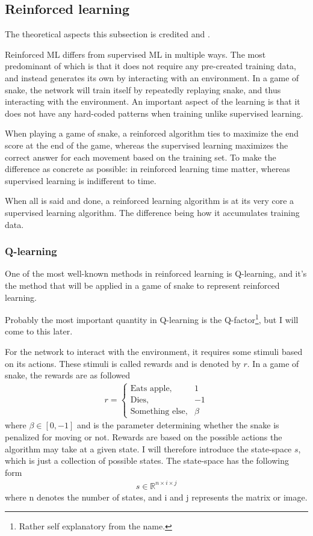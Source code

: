 \documentclass[%
 uio,
 jmp,
 amsmath,amssymb,
 reprint, nofootinbib]{revtex4-1}
\numberwithin{equation}{section}
\begin{document}
\subsection{Reinforced learning}

The theoretical aspects this subsection is credited \cite{RL} and \cite{wiki:Reinforcement_learning}.

Reinforced ML differs from supervised ML in multiple ways. The most predominant of which is that it does not require any pre-created training data, and instead generates its own by interacting with an environment. In a game of snake, the network will train itself by repeatedly replaying snake, and thus interacting with the environment. An important aspect of the learning is that it does not have any hard-coded patterns when training unlike supervised learning.

When playing a game of snake, a reinforced algorithm ties to maximize the end score at the end of the game, whereas the supervised learning maximizes the correct answer for each movement based on the training set. To make the difference as concrete as possible: in reinforced learning time matter, whereas supervised learning is indifferent to time.

When all is said and done, a reinforced learning algorithm is at its very core a supervised learning algorithm. The difference being how it accumulates training data.

\subsubsection{Q-learning}

One of the most well-known methods in reinforced learning is Q-learning, and it's the method that will be applied in a game of snake to represent reinforced learning.

Probably the most important quantity in Q-learning is the Q-factor\footnote{Rather self explanatory from the name.}, but I will come to this later.

For the network to interact with the environment, it requires some stimuli based on its actions. These stimuli is called rewards and is denoted by \(r\). In a game of snake, the rewards are as followed
\begin{align}\label{eq:13}
r = 
\begin{cases} 
  \text{Eats apple,} & 1 \\ 
  \text{Dies,} & -1\\
  \text{Something else,} & \beta
\end{cases}
\end{align}
where \(\beta\in [0,-1]\) and is the parameter determining whether the snake is penalized for moving or not. Rewards are based on the possible actions the algorithm may take at a given state. I will therefore introduce the state-space \(s\), which is just a collection of possible states. The state-space has the following form
\begin{align}
s\in \mathbb{R}^{n\times i\times j}
\end{align}
where n denotes the number of states, and i and j represents the matrix or image.
\end{document}
